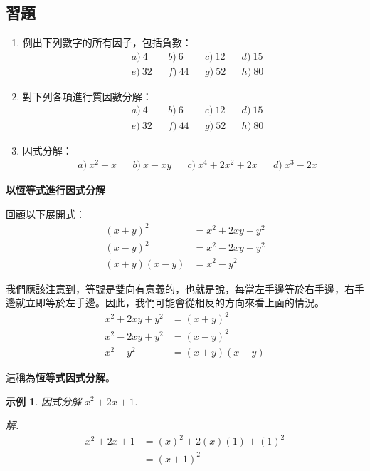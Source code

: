 \documentclass[12pt]{article}
\newtheorem{example}{示例}
\begin{document}
    \subsection*{習題}
    \begin{enumerate}
        \item 例出下列數字的所有因子，包括負數：\begin{align*}
            &a)\ 4&&b)\ 6&&c)\ 12&&d)\ 15\\
            &e)\ 32&&f)\ 44&&g)\ 52&&h)\ 80
        \end{align*}
        \item 對下列各項進行質因數分解：\begin{align*}
            &a)\ 4&&b)\ 6&&c)\ 12&&d)\ 15\\
            &e)\ 32&&f)\ 44&&g)\ 52&&h)\ 80
        \end{align*}
        \item 因式分解：\begin{align*}
            &a)\ x^2+x&&b)\ x-xy&&c)\ x^4+2x^2+2x&&d)\ x^3-2x
        \end{align*}
    \end{enumerate}

    \begin{center}
        \textbf{以恆等式進行因式分解}
    \end{center}

    回顧以下展開式：\begin{align*}
        (x+y)^2&=x^2+2xy+y^2\\
        (x-y)^2&=x^2-2xy+y^2\\
        (x+y)(x-y)&=x^2-y^2
    \end{align*}

    我們應該注意到，等號是雙向有意義的，也就是說，每當左手邊等於右手邊，右手邊就立即等於左手邊。因此，我們可能會從相反的方向來看上面的情況。\begin{align*}
        x^2+2xy+y^2&=(x+y)^2\\
        x^2-2xy+y^2&=(x-y)^2\\
        x^2-y^2&=(x+y)(x-y)
    \end{align*}

    這稱為\textbf{恆等式因式分解}。

    \begin{example}
        因式分解 $x^2+2x+1$.
    \end{example}
    \textit{ 解. }\begin{align*}
        x^2+2x+1&=(x)^2+2(x)(1)+(1)^2\\
        &=(x+1)^2
    \end{align*}
\end{document}
